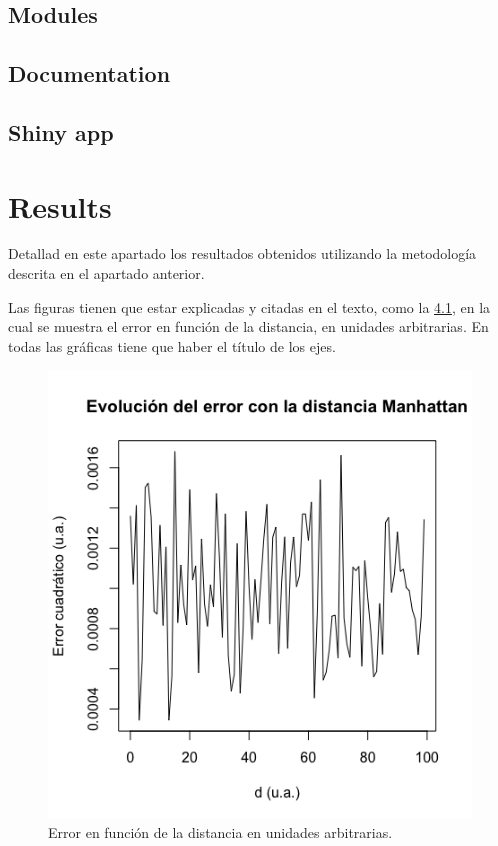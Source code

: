 \documentclass[ENG, BIB]{TFUOC}%
\begin{document}
\section{Modules} 

\section{Documentation}

\section{Shiny app}
 


\chapter{Results}

Detallad en este apartado los resultados obtenidos utilizando la metodología descrita en el apartado anterior.

Las figuras tienen que estar explicadas y citadas en el texto, como la \ref{fig:my_label}, en la cual se muestra el error en función de la distancia, en unidades arbitrarias. En todas las gráficas tiene que haber el título de los ejes.

\begin{figure}[!htbp]
    \centering
    \includegraphics[width=7truecm]{Template/Rplotmanh.png}
    \caption{Error en función de la distancia en unidades arbitrarias.}
    \label{fig:my_label}
\end{figure}
\end{document}
